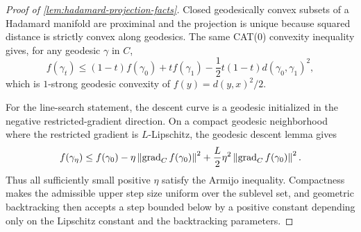 \begin{proof}[Proof of \cref{lem:hadamard-projection-facts}]
Closed geodesically convex subsets of a Hadamard manifold are proximinal and
the projection is unique because squared distance is strictly convex along
geodesics. The same CAT(0) convexity inequality gives, for any geodesic
\(\gamma\) in \(C\),
\[
  f(\gamma_t)
  \le
  (1-t)f(\gamma_0)+tf(\gamma_1)
  -\frac12t(1-t)d(\gamma_0,\gamma_1)^2,
\]
which is \(1\)-strong geodesic convexity of \(f(y)=d(y,x)^2/2\).

For the line-search statement, the descent curve is a geodesic initialized in
the negative restricted-gradient direction. On a compact geodesic neighborhood
where the restricted gradient is \(L\)-Lipschitz, the geodesic descent lemma
gives
\[
  f(\gamma_\eta)
  \le
  f(\gamma_0)-\eta\left\lVert \operatorname{grad}_C f(\gamma_0)\right\rVert^2
  +\frac{L}{2}\eta^2\left\lVert \operatorname{grad}_C f(\gamma_0)\right\rVert^2.
\]
Thus all sufficiently small positive \(\eta\) satisfy the Armijo inequality.
Compactness makes the admissible upper step size uniform over the sublevel set,
and geometric backtracking then accepts a step bounded below by a positive
constant depending only on the Lipschitz constant and the backtracking
parameters.
\end{proof}

